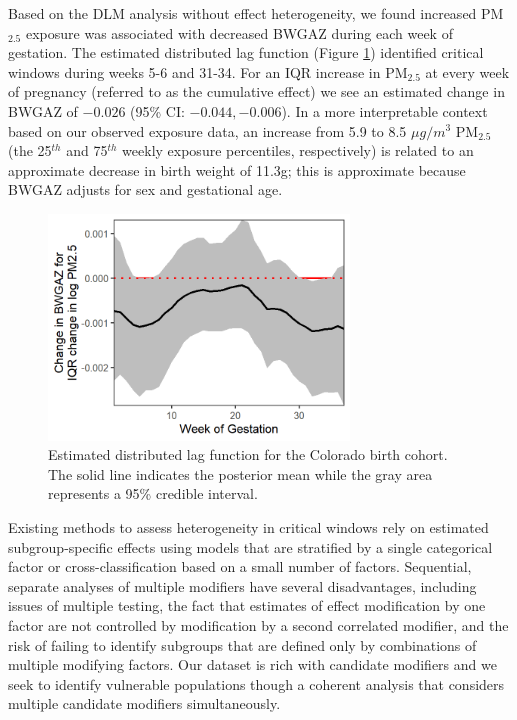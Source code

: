 \documentclass[12pt]{article}
\begin{document}
Based on the DLM analysis without effect heterogeneity, we found increased PM$_{2.5}$ exposure was associated with decreased BWGAZ during each week of gestation. The estimated distributed lag function (Figure \ref{fig:est_tdlm}) identified critical windows during weeks 5-6 and 31-34. For an IQR increase in PM$_{2.5}$ at every week of pregnancy (referred to as the cumulative effect) we see an estimated change in BWGAZ of $-0.026$ (95\% CI: $-0.044,-0.006$). In a more interpretable context based on our observed exposure data, an increase from 5.9 to 8.5 $\mu g/m^3$ PM$_{2.5}$ (the 25$^{th}$ and 75$^{th}$ weekly exposure percentiles, respectively) is related to an approximate decrease in birth weight of 11.3g; this is approximate because BWGAZ adjusts for sex and gestational age.

\begin{figure}[!ht]
    \centering
    \includegraphics[height=6cm]{img/bwgaz_tdlm.png}
    \caption{Estimated distributed lag function for the Colorado birth cohort. The solid line indicates the posterior mean while the gray area represents a 95\% credible interval.}
    \label{fig:est_tdlm}
\end{figure}

Existing methods to assess heterogeneity in critical windows rely on estimated subgroup-specific effects using models that are stratified by a single categorical factor or cross-classification based on a small number of factors. Sequential, separate analyses of multiple modifiers have several disadvantages, including issues of multiple testing, the fact that estimates of effect modification by one factor are not controlled by modification by a second correlated modifier, and the risk of failing to identify subgroups that are defined only by combinations of multiple modifying factors. Our dataset is rich with candidate modifiers and we seek to identify vulnerable populations though a coherent analysis that considers multiple candidate modifiers simultaneously. 
\end{document}
